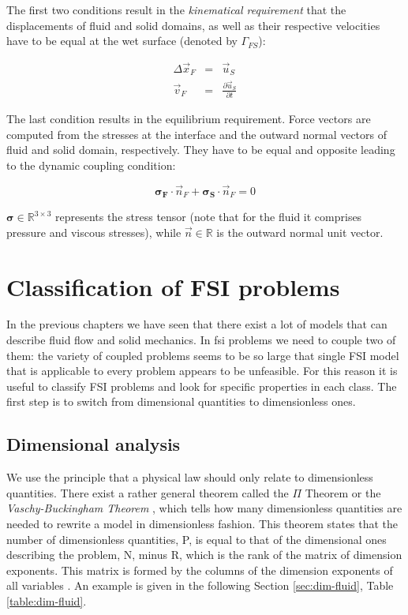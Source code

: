 The first two conditions result in the \textit{kinematical requirement} that the displacements of fluid and solid domains, as well as their respective velocities have to be equal at the wet surface (denoted by $\Gamma_{FS}$): 

\begin{eqnarray}
 \Delta\vec{x}_F &=& \vec{u}_S \\
 \vec{v}_F &=& \frac{\partial \vec{u}_S}{\partial t}
\end{eqnarray}

The last condition results in the equilibrium requirement. Force vectors are computed from the stresses at the interface and the outward normal vectors of fluid and solid domain, respectively. They have to be equal and opposite leading to the dynamic coupling condition:

\begin{equation}
\bm{\sigma_F} \cdot \vec{n}_F + \bm{\sigma_S} \cdot \vec{n}_F = 0
\end{equation}

$\bm{\sigma} \in \mathbb{R}^{3 \times 3}$ represents the stress tensor (note that for the fluid it comprises pressure and viscous stresses), while $\vec{n} \in \mathbb{R}$ is the outward normal unit vector.


\section{Classification of FSI problems}
\label{sec:classification}

In the previous chapters we have seen that there exist a lot of models that can describe fluid flow and solid mechanics. In \acrlong{fsi} problems we need to couple two of them: the variety of coupled problems seems to be so large that  single FSI model that is applicable to every problem appears to be unfeasible. For this reason it is useful to classify FSI problems and look for specific properties in each class.  
The first step is to switch from dimensional quantities to dimensionless ones.


\subsection{Dimensional analysis}
\label{sec:dimensional}

We use the principle that a physical law should only relate to dimensionless quantities.  
There exist a rather general theorem called the $\Pi$ Theorem or the \textit{Vaschy-Buckingham Theorem} \cite{HancheOlsen2004}, which tells how many dimensionless quantities are needed to rewrite a model in dimensionless fashion.
This theorem states that the number of dimensionless quantities, P, is equal to that of the dimensional ones describing the problem, N, minus R, which is the rank of the matrix of dimension exponents. This matrix is formed by the columns of the dimension exponents of all variables \cite{hardtke2019buckingham}. An example is given in the following Section \ref{sec:dim-fluid}, Table \ref{table:dim-fluid}.

